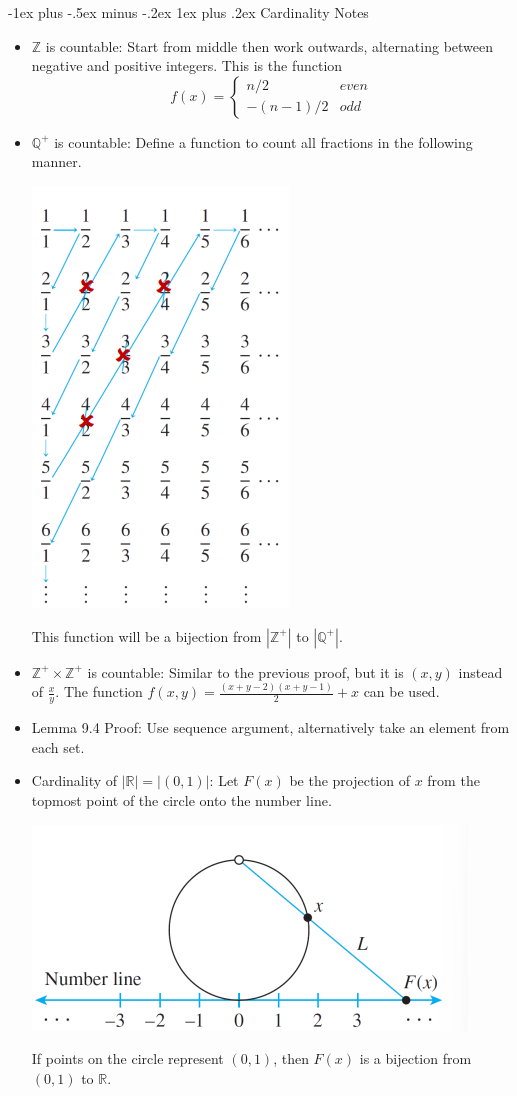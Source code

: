 \documentclass[10pt, portrait]{article}
\makeatletter
\renewcommand{\subsection}{\@startsection{subsection}{3}{0mm}%
                                {-1ex plus -.5ex minus -.2ex}%
                                {1ex plus .2ex}%
                                {\normalfont\small\bfseries}}%
\makeatother
\begin{document}
\begin{multicols*}{2}
\subsection{Cardinality Notes}
\begin{itemize}
    \item $\mathbb{Z}$ is countable: Start from middle then work outwards, alternating between negative and positive integers. This is the function
    \[ f(x) = \begin{cases} 
      n / 2 & even \\
      -(n-1)/2 & odd
   \end{cases}
    \]
    \item $\mathbb{Q}^+$ is countable: Define a function to count all fractions in the following manner. \\
    \begin{center}
        \includegraphics[width=0.3\linewidth]{qpluscountable.png} \\
    \end{center}
    This function will be a bijection from $|\mathbb{Z}^+|$ to $|\mathbb{Q}^+|$.
    \item $\mathbb{Z}^+ \times \mathbb{Z}^+$ is countable: Similar to the previous proof, but it is $(x, y)$ instead of $\frac{x}{y}$. The function $f(x, y) = \frac{(x+y-2)(x+y-1)}{2} + x$ can be used.
    \item Lemma 9.4 Proof: Use sequence argument, alternatively take an element from each set.
    \item Cardinality of $|\mathbb{R}| = |(0, 1)|$: Let $F(x)$ be the projection of $x$ from the topmost point of the circle onto the number line.
    \begin{center}
        \includegraphics[width=0.5\linewidth]{realcardinality.png} \\
    \end{center}
    If points on the circle represent $(0, 1)$, then $F(x)$ is a bijection from $(0, 1)$ to $\mathbb{R}$.
\end{itemize}


\end{multicols*}
\end{document}
